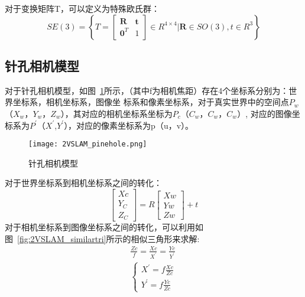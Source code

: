 对于变换矩阵T，可以定义为特殊欧氏群：
\begin{equation}
S E(3)=\left\{T=\left[\begin{array}{cc}{\mathbf{R}} & {\mathbf{t}} \\ {\mathbf{0}^{T}} & {1}\end{array}\right] \in R^{4 \times 4} | \mathbf{R} \in S O(3), t \in R^{3}\right\}
\end{equation}




\subsection{针孔相机模型}
对于针孔相机模型，如图~\ref{fig:2VSLAM_pinehole}所示，（其中f为相机焦距）存在4个坐标系分别为：世界坐标系，相机坐标系，图像坐
标系和像素坐标系，对于真实世界中的空间点$P_w$（$X_w$，$Y_w$，$Z_w$），其对应的相机坐标系坐标为$P_c$（$C_w$，$C_w$，$C_w$）,
对应的图像坐标系为$P^{'}$（$X^{'}$,$Y^{'}$），对应的像素坐标系为p（u，v）。
\begin{figure}[H] %
  \centering
  \texttt{[image: 2VSLAM\_pinehole.png]}
  \caption{针孔相机模型}
  \label{fig:2VSLAM_pinehole}
\end{figure}
对于世界坐标系到相机坐标系之间的转化：
\begin{equation}
  \left[\begin{array}{l}{X c} \\ {Y_{C}} \\ {Z_{C}}\end{array}\right]=R\left[\begin{array}{l}{X w} \\ {Y w} \\ {Z w}\end{array}\right]+t
  \label{equ:world2cam}
\end{equation}
对于相机坐标系到图像坐标系之间的转化，可以利用如图~\ref{fig:2VSLAM_similartri}所示的相似三角形来求解:
\begin{equation}
  \begin{split}
    \frac{Z c}{f}=\frac{X c}{X^{'}}=\frac{Y c}{Y^{'}}\\
    \left\{\begin{array}{l}{X^{\prime}=f \frac{X c}{Z c}} \\ {Y^{\prime}=f \frac{Y c}{Z c}}\end{array}\right.
\end{split}
\label{equ:cam2photo}
\end{equation}
